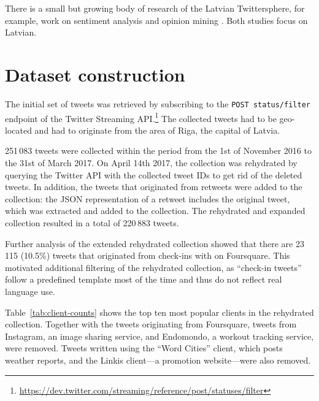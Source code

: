 \documentclass[11pt,a4paper]{article}
\begin{document}
There is a small but growing body of research of the Latvian Twittersphere, for example, work on sentiment analysis \cite{Peisenieks2014} and opinion mining \cite{vspats2016opinion}. Both studies focus on Latvian.

\section{Dataset construction}
\label{sec:construction}

The initial set of tweets was retrieved by subscribing to the \texttt{POST status/filter} endpoint of the Twitter Streaming API.\footnote{\url{https://dev.twitter.com/streaming/reference/post/statuses/filter}}
The collected tweets had to be geo-located and had to originate from the area of Riga, the capital of Latvia.\footnotemark{}



251\,083 tweets were collected within the period from the 1st of November 2016 to the 31st of March 2017. On April 14th 2017, the collection was rehydrated by querying the Twitter API with the collected tweet IDs to get rid of the deleted tweets. In addition, the tweets that originated from retweets were added to the collection: the JSON representation of a retweet includes the original tweet, which was extracted and added to the collection. The rehydrated and expanded collection resulted in a total of 220\,883 tweets. %

% 

Further analysis of the extended rehydrated collection showed that there are 23\,115 (10.5\%) tweets that originated from check-ins with on Foursquare. %
This motivated additional filtering of the rehydrated collection, as ``check-in tweets'' follow a predefined template most of the time and thus do not reflect real language use. %



Table~\ref{tab:client-counts} shows the top ten most popular clients in the rehydrated collection. Together with the tweets originating from Foursquare, tweets from Instagram, %
an image sharing service, and Endomondo, %
a workout tracking service, were removed. Tweets written using the ``Word Cities'' client, which posts weather reports, and the Linkis client---a promotion website---were also removed.
\end{document}
